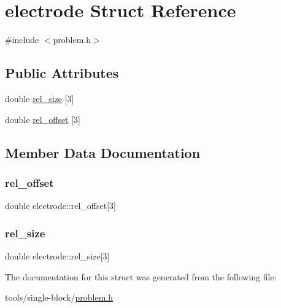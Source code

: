 \hypertarget{structelectrode}{}\section{electrode Struct Reference}
\label{structelectrode}


{\ttfamily \#include $<$problem.\+h$>$}

\subsection*{Public Attributes}
\begin{DoxyCompactItemize}
\item 
double \mbox{\hyperlink{structelectrode_a1ea0c3d516065258adfc41f8d87928ef}{rel\+\_\+size}} \mbox{[}3\mbox{]}
\item 
double \mbox{\hyperlink{structelectrode_a8461e7dc4ab21aef9851f431b107da60}{rel\+\_\+offset}} \mbox{[}3\mbox{]}
\end{DoxyCompactItemize}


\subsection{Member Data Documentation}
\mbox{\label{structelectrode_a8461e7dc4ab21aef9851f431b107da60}} 
\subsubsection{\texorpdfstring{rel\+\_\+offset}{rel\_offset}}
{\footnotesize\ttfamily double electrode\+::rel\+\_\+offset\mbox{[}3\mbox{]}}

\mbox{\label{structelectrode_a1ea0c3d516065258adfc41f8d87928ef}} 
\subsubsection{\texorpdfstring{rel\+\_\+size}{rel\_size}}
{\footnotesize\ttfamily double electrode\+::rel\+\_\+size\mbox{[}3\mbox{]}}



The documentation for this struct was generated from the following file\+:\begin{DoxyCompactItemize}
\item 
tools/single-\/block/\mbox{\hyperlink{problem_8h}{problem.\+h}}\end{DoxyCompactItemize}
